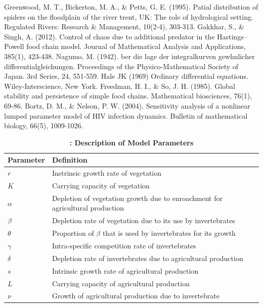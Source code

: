 \documentclass[12pt]{article}
\numberwithin{equation}{section}
\begin{document}
\begin{thebibliography}{99}
  Greenwood, M. T., Bickerton, M. A., \& Petts, G. E. (1995). Patial distribution of spiders on the floodplain of the river trent, UK: The role of hydrological setting. Regulated Rivers: Research \& Management, 10(2‐4), 303-313.
  Gakkhar, S., \& Singh, A. (2012). Control of chaos due to additional predator in the Hastings–Powell food chain model. Journal of Mathematical Analysis and Applications, 385(1), 423-438.
  Nagumo, M. (1942). ber die lage der integralkurven gewhnlicher differentialgleichungen. Proceedings of the Physico-Mathematical Society of Japan. 3rd Series, 24, 551-559.
  Hale JK (1969) Ordinary differential equations. Wiley-Interscience, New York.
  Freedman, H. I., \& So, J. H. (1985). Global stability and persistence of simple food chains. Mathematical biosciences, 76(1), 69-86.
  Bortz, D. M., \& Nelson, P. W. (2004). Sensitivity analysis of a nonlinear lumped parameter model of HIV infection dynamics. Bulletin of mathematical biology, 66(5), 1009-1026.
\end{thebibliography}
\begin{table}[htp!] \label{Table 1}
	\renewcommand{\arraystretch}{2}
	\caption{\textbf{: Description of Model Parameters}}
	\begin{center}
		\begin{tabular}{|p{2cm}||p{9cm}||p{5cm}|}
        \hline
			\textbf{Parameter} & \textbf{Definition} \\
			\hline
			$r$ & Instrinsic growth rate of vegetation\\
			\hline
			$K$ & Carrying capacity of vegetation\\
			\hline
			${\alpha}$ & Depletion of vegetation growth due to enroachment for agricultural production\\
			\hline
			${\beta}$ & Depletion rate of vegetation due to its use by invertebrates\\
			\hline
			${\theta}$ & Proportion of $\beta$ that is used by invertebrates for its growth\\
		    \hline
			${\gamma}$ & Intra-specific competition rate of invertebrates\\
		    \hline
			${\delta}$ & Depletion rate of invertebrates due to agricultural production\\
		    \hline
			${s}$ & Intrinsic growth rate of agricultural production\\
			\hline
			${L}$ & Carrying capacity of agricultural production\\
			\hline
			${\nu}$ & Growth of agricultural production due to invertebrate\\
			\hline			
		\end{tabular}\label{Table 1}
	\end{center}
\end{table}
\end{document}
